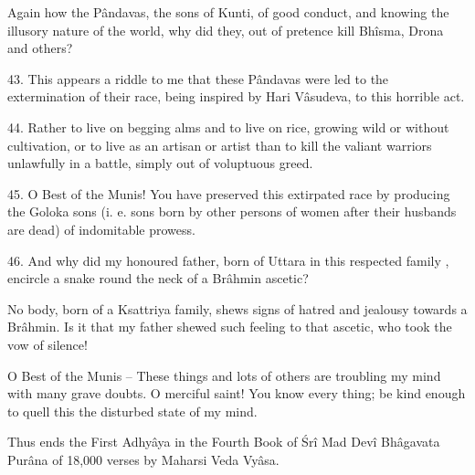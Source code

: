 Again how the P\^andavas, the sons of Kunti, of good conduct, and knowing the illusory nature of the world, why did they, out of pretence kill Bh\^isma, Drona and others?

43. This appears a riddle to me that these P\^andavas were led to the extermination of their race, being inspired by Hari V\^asudeva, to this horrible act.

44. Rather to live on begging alms and to live on rice, growing wild or without cultivation, or to live as an artisan or artist than to kill the valiant warriors unlawfully in a battle, simply out of voluptuous greed.

45. O Best of the Munis! You have preserved this extirpated race by producing the Goloka sons (i. e. sons born by other persons of women after their husbands are dead) of indomitable prowess.

46. And why did my honoured father, born of Uttara in this respected family , encircle a snake round the neck of a Br\^ahmin ascetic?

No body, born of a Ksattriya family, shews signs of hatred and jealousy towards a Br\^ahmin. Is it that my father shewed such feeling to that ascetic, who took the vow of silence!

O Best of the Munis -- These things and lots of others are troubling my mind with many grave doubts. O merciful saint! You know every thing; be kind enough to quell this the disturbed state of my mind.

Thus ends the First Adhy\^aya in the Fourth Book of \'Sr\^i Mad Dev\^i Bh\^agavata Pur\^ana of 18,000 verses by Maharsi Veda Vy\^asa.